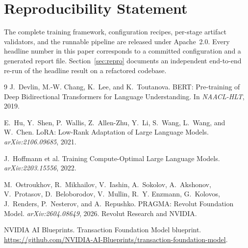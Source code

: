 \documentclass[10pt,letterpaper]{article}
\begin{document}
\section*{Reproducibility Statement}
The complete training framework, configuration recipes, per-stage artifact validators, and the
runnable pipeline are released under Apache~2.0. Every headline number in this paper corresponds to
a committed configuration and a generated report file. Section~\ref{sec:repro} documents an
independent end-to-end re-run of the headline result on a refactored codebase.

\sloppy
\begin{thebibliography}{9}
J.~Devlin, M.-W. Chang, K.~Lee, and K.~Toutanova.
\newblock BERT: Pre-training of Deep Bidirectional Transformers for Language Understanding.
\newblock In \emph{NAACL-HLT}, 2019.

E.~Hu, Y.~Shen, P.~Wallis, Z.~Allen-Zhu, Y.~Li, S.~Wang, L.~Wang, and W.~Chen.
\newblock LoRA: Low-Rank Adaptation of Large Language Models.
\newblock \emph{arXiv:2106.09685}, 2021.

J.~Hoffmann et al.
\newblock Training Compute-Optimal Large Language Models.
\newblock \emph{arXiv:2203.15556}, 2022.

M.~Ostroukhov, R.~Mikhailov, V.~Iashin, A.~Sokolov, A.~Akshonov, V.~Protasov, D.~Beloborodov,
V.~Mullin, R.~Y. Enzmann, G.~Kolovos, J.~Renders, P.~Nesterov, and A.~Repushko.
\newblock PRAGMA: Revolut Foundation Model.
\newblock \emph{arXiv:2604.08649}, 2026. Revolut Research and NVIDIA.

NVIDIA AI Blueprints.
\newblock Transaction Foundation Model blueprint.
\newblock \url{https://github.com/NVIDIA-AI-Blueprints/transaction-foundation-model}.
\end{thebibliography}
\end{document}
